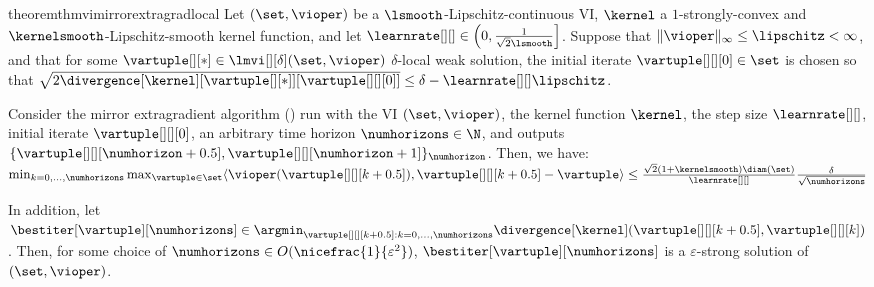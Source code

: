 \begin{restatable}{theorem}{thmvimirrorextragradlocal}\label{thm:vi_mirror_extragrad_local}
    Let $(\set, \vioper)$ be a $\lsmooth$-Lipschitz-continuous VI, $\kernel$ a $1$-strongly-convex and $\kernelsmooth$-Lipschitz-smooth kernel function, and let $\learnrate[ ][ ] \in  \left(0, \frac{1}{\sqrt{2}\lsmooth}\right]$. Suppose that $\|\vioper\|_\infty \leq \lipschitz < \infty$, and that for some $\vartuple[][*] \in \lmvi[][\delta](\set, \vioper)$ $\delta$-local weak solution, the initial iterate $\vartuple[][][0] \in \set$ is chosen so that $\sqrt{2\divergence[\kernel][{\vartuple[][*]}][{\vartuple[][][0]}]} \leq \delta - \learnrate[ ][ ] \lipschitz$.
     
     Consider the mirror extragradient algorithm ()  run with the VI $(\set, \vioper)$, the kernel function $\kernel$, the step size $\learnrate[ ][ ]$, initial iterate $\vartuple[][][0]$, an arbitrary time horizon $\numhorizons \in \N$, and outputs $\{\vartuple[][][\numhorizon + 0.5], \vartuple[][][\numhorizon + 1]\}_{\numhorizon}$. Then, we have:
    $
     \min_{k = 0, \hdots, \numhorizons} \max_{\vartuple \in \set} \langle \vioper(\vartuple[][][k + 0.5]), \vartuple[][][k + 0.5] - \vartuple \rangle \leq  \frac{\sqrt{2} (1 + \kernelsmooth) \diam(\set)}{\learnrate[ ][ ]} \frac{\delta}{\sqrt{\numhorizons}}
    $

    In addition, let $\bestiter[\vartuple][\numhorizons] \in \argmin_{\vartuple[][][k+0.5] : k = 0, \hdots, \numhorizons} \divergence[\kernel](\vartuple[][][k+0.5], \vartuple[][][k])$. Then, for some choice of $\numhorizons \in O(\nicefrac{1}{\varepsilon^2})$,  $\bestiter[\vartuple][\numhorizons]$ is a $\varepsilon$-strong solution of $(\set, \vioper)$.
\end{restatable}